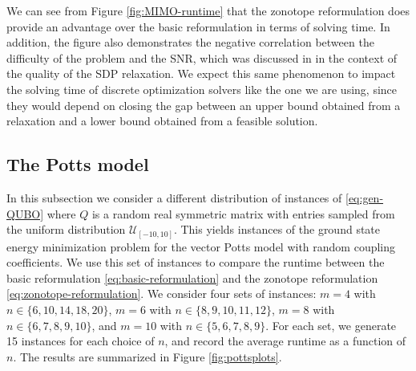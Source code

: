 \documentclass{article}
\theoremstyle{definition}
\begin{document}
We can see from Figure \ref{fig:MIMO-runtime} that the zonotope reformulation does provide an advantage over the basic reformulation in terms of solving time. In addition, the figure also demonstrates the negative correlation between the difficulty of the problem and the SNR, which was discussed in \cite{lu2019tightness,lu2020enhanced} in the context of the quality of the SDP relaxation. We expect this same phenomenon to impact the solving time of discrete optimization solvers like the one we are using, since they would depend on closing the gap between an upper bound obtained from a relaxation and a lower bound obtained from a feasible solution.


\subsection{The Potts model}

In this subsection we consider a different distribution of instances of \eqref{eq:gen-QUBO} where $Q$ is a random real symmetric matrix with entries sampled from the uniform distribution $\mathcal{U}_{[-10,10]}$. This yields instances of the ground state energy minimization problem for the vector Potts model \cite{pottsmodel} with random coupling coefficients. We use this set of instances to compare the runtime between the basic reformulation \eqref{eq:basic-reformulation} and the zonotope reformulation \eqref{eq:zonotope-reformulation}. We consider four sets of instances: $m = 4$ with $ n \in \{6,10,14,18,20\}$, $m = 6$ with $n \in \{8,9,10,11,12\}$, $m = 8$ with $n \in \{6,7,8,9,10\}$, and $m = 10$ with $n \in \{5,6,7,8,9\}$. For each set, we generate 15 instances for each choice of $n$, and record the average runtime as a function of $n$. The results are summarized in Figure \ref{fig:pottsplots}. 
\end{document}
